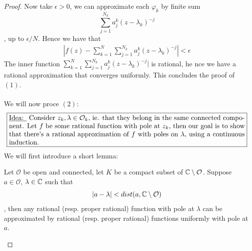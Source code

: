 \documentclass{article}
\begin{document}
\begin{proof}
Now take $\epsilon > 0$, we can approximate each $\varphi_k$ by finite sum
\[\sum_{j = 1}^{N_k} a^k_j (z - \lambda_k)^{-j}\]
, up to $\epsilon/N$. Hence we have that
\begin{align*}
    |f(z) - \sum_{k = 1}^N \sum_{j = 1}^{N_k} a_j^k (z - \lambda_k)^{-j}| < \epsilon
\end{align*}
The inner function $\sum_{k = 1}^N \sum_{j = 1}^{N_k} a_j^k (z - \lambda_k)^{-j}|$ is rational, he nce we have a rational approximation that converges uniformly. This concludes the proof of $(1)$.\\\\
We will now proce $(2)$:
    \[\noindent\fbox{%
    \parbox{\textwidth}{%
    \underline{Idea: } Consider $z_k, \lambda \in \mathcal{O}_k$, ie. that they belong in the same connected component. Let $f$ be some rational function with pole at $z_k$, then our goal is to show that there's a rational approximation of $f$ with poles on $\lambda$, using a continuous induction.
    }%
}\]
We will first introduce a short lemma:
\begin{lemma}
    Let $\mathcal{O}$ be open and connected, let $K$ be a compact subset of $\mathbb{C} \setminus \mathcal{O}$. Suppose $a \in \mathcal{O}$, $\lambda \in \mathbb{C}$ such that
    \[|a - \lambda| < dist(a, \mathbb{C} \setminus \mathcal{O})\]
    , then any rational (resp. proper rational) function with pole at $\lambda$ can be approximated by rational (resp. proper rational) functions uniformly with pole at $a$.
\end{lemma}


\end{proof}
\end{document}
